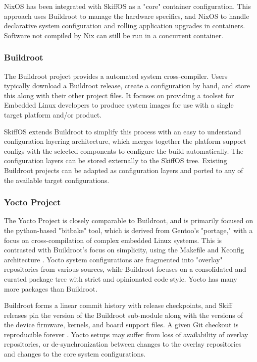 \documentclass[english,]{IEEEtran}
\begin{document}
NixOS has been integrated with SkiffOS as a "core" container
configuration. This approach uses Buildroot to manage the hardware
specifics, and NixOS to handle declarative system configuration and
rolling application upgrades in containers. Software not compiled by Nix
can still be run in a concurrent container.

\hypertarget{buildroot}{%
\subsubsection{Buildroot}\label{buildroot}}

The Buildroot \autocite{buildroot} project provides a automated system
cross-compiler. Users typically download a Buildroot release, create a
configuration by hand, and store this along with their other project
files. It focuses on providing a toolset for Embedded Linux developers
to produce system images for use with a single target platform and/or
product.

SkiffOS extends Buildroot to simplify this process with an easy to
understand configuration layering architecture, which merges together
the platform support configs with the selected components to configure
the build automatically. The configuration layers can be stored
externally to the SkiffOS tree. Existing Buildroot projects can be
adapted as configuration layers and ported to any of the available
target configurations.

\hypertarget{yocto-project}{%
\subsubsection{Yocto Project}\label{yocto-project}}

The Yocto Project \autocite{yocto} is closely comparable to Buildroot,
and is primarily focused on the python-based "bitbake" tool, which is
derived from Gentoo's "portage," with a focus on cross-compilation of
complex embedded Linux systems. This is contrasted with Buildroot's
focus on simplicity, using the Makefile and Kconfig architecture
\autocite{yoctobr}. Yocto system configurations are fragmented into
"overlay" repositories from various sources, while Buildroot focuses on
a consolidated and curated package tree with strict and opinionated code
style. Yocto has many more packages than Buildroot.

Buildroot \autocite{buildroot} forms a linear commit history with
release checkpoints, and Skiff releases pin the version of the Buildroot
sub-module along with the versions of the device firmware, kernels, and
board support files. A given Git checkout is reproducible forever
\autocite{buildrootrt}. Yocto setups may suffer from loss of
availability of overlay repositories, or de-synchronization between
changes to the overlay repositories and changes to the core system
configurations.
\end{document}
